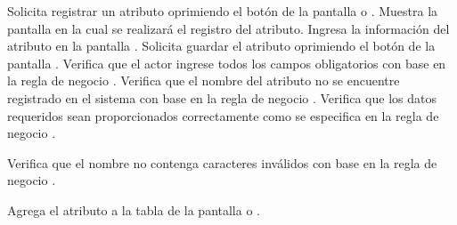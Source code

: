  \begin{UCtrayectoria}
    \UCpaso[\UCactor] Solicita registrar un atributo oprimiendo el botón  de la pantalla  o .
    \UCpaso[\UCsist] Muestra la pantalla  en la cual se realizará el registro del atributo. 
    \UCpaso[\UCactor] Ingresa la información del atributo en la pantalla . \label{cu11.5:ingresaDatos}
    \UCpaso[\UCactor] Solicita guardar el atributo oprimiendo el botón  de la pantalla . 
    \UCpaso[\UCsist] Verifica que el actor ingrese todos los campos obligatorios con base en la regla de negocio  . 
    \UCpaso[\UCsist] Verifica que el nombre del atributo no se encuentre registrado en el sistema con base en la regla de negocio  . 
    \UCpaso[\UCsist] Verifica que los datos requeridos sean proporcionados correctamente como se especifica en la regla de negocio .  
    
    \UCpaso[\UCsist] Verifica que el nombre no contenga caracteres inválidos con base en la regla de negocio . 

    \UCpaso[\UCsist] Agrega el atributo a la tabla de la pantalla  o .
 \end{UCtrayectoria}
 
